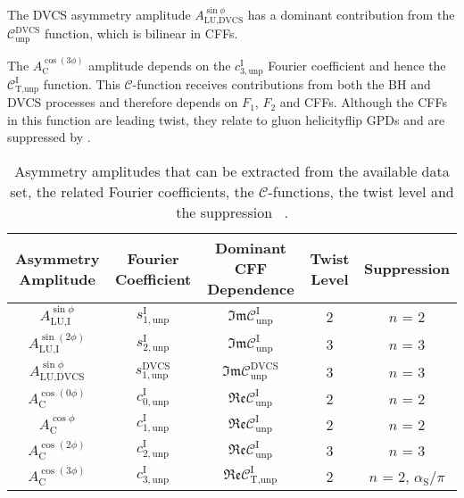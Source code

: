 The DVCS asymmetry amplitude $A^{\sin\phi}_{\textrm{LU,DVCS}}$ has a dominant
contribution from the $\mathcal{C}_{\textrm{unp}}^{\textrm{DVCS}}$ function,
which is bilinear in CFFs. 

The $A^{\cos(3\phi)}_{\textrm{C}}$ amplitude depends on the
$c_{3,\textrm{unp}}^{\textrm{I}}$ Fourier coefficient and hence the
$\mathcal{C}_{\textrm{T,unp}}^{\textrm{I}}$ function. This
$\mathcal{C}$-function receives contributions from both the BH and DVCS
processes and therefore depends on $F_{1}$, $F_{2}$ and CFFs. Although the CFFs
in this function are  leading twist, they relate to gluon helicity\blue{-}flip GPDs and are  suppressed by .
\begin{table}[H]
\begin{center}
\resizebox{16cm}{!} {
 \begin{tabular}{|c|c|c|c|c|}
\hline
Asymmetry Amplitude & Fourier Coefficient& Dominant CFF Dependence & Twist Level  & Suppression \\
\hline
\hline
$A_{\textrm{LU,I}}^{\sin\phi}$ & $s_{1,\textrm{unp}}^{\textrm{I}}$  &
$\mathfrak{Im}\mathcal{C}_{\textrm{unp}}^{\textrm{I}}$
&  2 & $n$ = 2\\
\hline
$A_{\textrm{LU,I}}^{\sin(2\phi)}$ & $s_{2,\textrm{unp}}^{\textrm{I}}$ 
&
$\mathfrak{Im}\mathcal{C}_{\textrm{unp}}^{\textrm{I}}$
&  3 & $n$ = 3\\
\hline
\hline
$A_{\textrm{LU,DVCS}}^{\sin\phi}$ & $s_{1, \textrm{unp}}^{\textrm{DVCS}}$ &
$\mathfrak{Im}\mathcal{C}_{\textrm{unp}}^{\textrm{DVCS}}$ &  3& $n$
= 3 \\
\hline
\hline
$A_{\textrm{C}}^{\cos(0\phi)}$ & $c_{0,\textrm{unp}}^{\textrm{I}}$  &
$\mathfrak{Re}\mathcal{C}_{\textrm{unp}}^{\textrm{I}}$ & 2& $n$ = 2
\\
\hline
$A_{\textrm{C}}^{\cos\phi}$ & $c_{1,\textrm{unp}}^{\textrm{I}}$  &
$\mathfrak{Re}\mathcal{C}_{\textrm{unp}}^{\textrm{I}}$ & 2 & $n$ = 2
\\
\hline
$A_{\textrm{C}}^{\cos(2\phi)}$ & $c_{2,\textrm{unp}}^{\textrm{I}}$ &
$\mathfrak{Re}\mathcal{C}_{\textrm{unp}}^{\textrm{I}}$ & 3 & $n$ = 3 \\
\hline
$A_{\textrm{C}}^{\cos(3\phi)}$ & $c_{3,\textrm{unp}}^{\textrm{I}}$ &
$\mathfrak{Re}\mathcal{C}_{\textrm{T,unp}}^{\textrm{I}}$ &  2 & $n$ = 2, $\alpha_{\textrm{S}}/\pi$ \\
\hline
 \end{tabular}
}
\caption{Asymmetry amplitudes that can
be extracted from the available data set, the related Fourier coefficients,
 the $\mathcal{C}$-functions, the twist level and the suppression ~\cite{Belitsky2002}.}
\label{tab_amplitudes}
\end{center}
\end{table}
 
